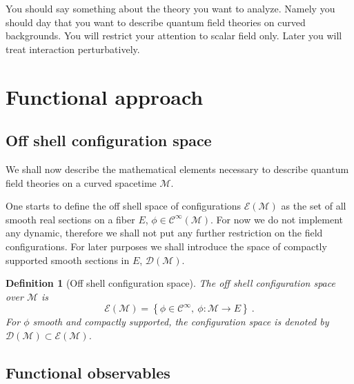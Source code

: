 \documentclass[10pt]{book}
\newcommand{\Ccal}{\mathcal{C}}
\newcommand{\Dcal}{\mathcal{D}}
\newcommand{\Ecal}{\mathcal{E}}
\newcommand{\Mcal}{\mathcal{M}}
\theoremstyle{break}
\newtheorem{definition}{Definition}
\begin{document}
You should say something about the theory you want to analyze.
Namely you should day that you want to describe quantum field theories on curved backgrounds. You will restrict your attention to scalar field only.  Later you will treat interaction perturbatively.


\section{Functional approach}

\subsection{Off shell configuration space}

We shall now describe the mathematical elements necessary to describe quantum field theories on a curved spacetime $\Mcal$. %

%
One starts to define the off shell space of configurations $\Ecal(\Mcal)$ as the set of all smooth real sections on a fiber $E$, $\phi \in \Ccal^\infty\left(\Mcal\right)$. For now we do not implement any dynamic, therefore we shall not put any further restriction on the field configurations. %
%
For later purposes we shall introduce the space of compactly supported smooth sections in $E$, $\Dcal(\Mcal)$.\par%
%
\begin{definition}[Off shell configuration space]
The off shell configuration space over $\Mcal$ is 
%
\begin{equation*}
\Ecal(\Mcal) = \left\{ \phi \in \Ccal^\infty, \  \phi : \Mcal \to E \right\} \ .
\end{equation*}
%
For $\phi$ smooth and compactly supported, the configuration space is denoted by $\Dcal(\Mcal) \subset \Ecal(\Mcal)$.
\end{definition}


\subsection{Functional observables}
\end{document}
